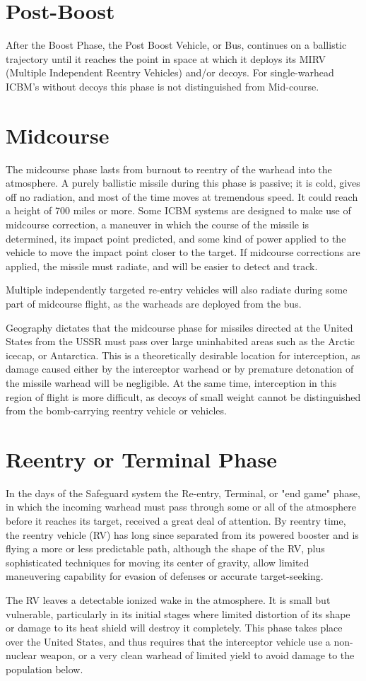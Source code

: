 \section{Post-Boost}
After the Boost Phase, the Post Boost Vehicle, or Bus, continues on a ballistic trajectory until it reaches the point in space at which it deploys its MIRV (Multiple Independent Reentry Vehicles) and/or decoys. For single-warhead ICBM's without decoys this phase is not distinguished from Mid-course.

\section{Midcourse}
The midcourse phase lasts from burnout to reentry of the warhead into the atmosphere. A purely ballistic missile during this phase is passive; it is cold, gives off no radiation, and most of the time moves at tremendous speed. It could reach a height of 700 miles or more. Some ICBM systems are designed to make use of midcourse correction, a maneuver in which the course of the missile is determined, its impact point predicted, and some kind of power applied to the vehicle to move the impact point closer to the target. If midcourse corrections are applied, the missile must radiate, and will be easier to detect and track.

Multiple independently targeted re-entry vehicles will also radiate during some part of midcourse flight, as the warheads are deployed from the bus.

Geography dictates that the midcourse phase for missiles directed at the United States from the USSR must pass over large uninhabited areas such as the Arctic icecap, or Antarctica. This is a theoretically desirable location for interception, as damage caused either by the interceptor warhead or by premature detonation of the missile warhead will be negligible. At the same time, interception in this region of flight is more difficult, as decoys of small weight cannot be distinguished from the bomb-carrying reentry vehicle or vehicles.

\section{Reentry or Terminal Phase}
In the days of the Safeguard system the Re-entry, Terminal, or "end game" phase, in which the incoming warhead must pass through some or all of the atmosphere before it reaches its target, received a great deal of attention. By reentry time, the reentry vehicle (RV) has long since separated from its powered booster and is flying a more or less predictable path, although the shape of the RV, plus sophisticated techniques for moving its center of gravity, allow limited maneuvering capability for evasion of defenses or accurate target-seeking.

The RV leaves a detectable ionized wake in the atmosphere. It is small but vulnerable, particularly in its initial stages where limited distortion of its shape or damage to its heat shield will destroy it completely. This phase takes place over the United States, and thus requires that the interceptor vehicle use a non-nuclear weapon, or a very clean warhead of limited yield to avoid damage to the population below.
